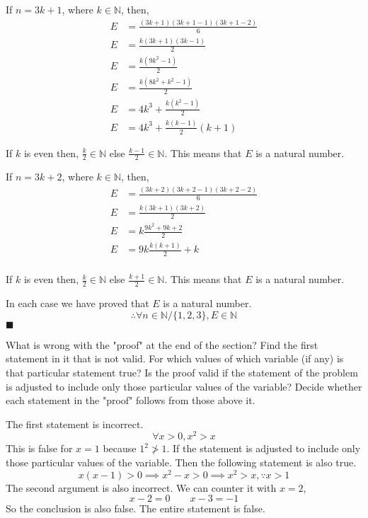 \documentclass{exam}
\theoremstyle{mytheoremstyle}
\theoremstyle{mytheoremstyle}
\theoremstyle{myproblemstyle}
\begin{document}
\begin{questions}
\begin{solution}
		If \(n=3k+1\), where \(k\in\mathbb{N}\), then,
		\begin{equation}
			\begin{split}
				E&=\frac{(3k+1)(3k+1-1)(3k+1-2)}{6}\\
				E&=\frac{k(3k+1)(3k-1)}{2}\\
				E&=\frac{k(9k^2-1)}{2}\\
				E&=\frac{k(8k^2+k^2-1)}{2}\\
				E&=4k^3+\frac{k(k^2-1)}{2}\\
				E&=4k^3+\frac{k(k-1)}{2}(k+1)
			\end{split}
		\end{equation}

		If \(k\) is even then, \(\displaystyle\frac{k}{2}\in\mathbb{N}\) else \(\displaystyle\frac{k-1}{2}\in\mathbb{N}\). This means that \(E\) is a natural number.

		If \(n=3k+2\), where \(k\in\mathbb{N}\), then,
		\begin{equation}
			\begin{split}
				E&=\frac{(3k+2)(3k+2-1)(3k+2-2)}{6}\\
				E&=\frac{k(3k+1)(3k+2)}{2}\\
				E&=k\frac{9k^2+9k+2}{2}\\
				E&=9k\frac{k(k+1)}{2}+k\\
			\end{split}
		\end{equation}

		If \(k\) is even then, \(\displaystyle\frac{k}{2}\in\mathbb{N}\) else \(\displaystyle\frac{k+1}{2}\in\mathbb{N}\). This means that \(E\) is a natural number.

		In each case we have proved that \(E\) is a natural number.
		\[\therefore \forall n\in\mathbb{N}/\{1,2,3\},E\in\mathbb{N}\]
		\center \(\blacksquare\)
	\end{solution}

	\question What is wrong with the "proof" at the end of the section? Find the first statement in it that is not valid. For which values of which variable (if any) is that particular statement true? Is the proof valid if the statement of the problem is adjusted to include only those particular values of the variable? Decide whether each statement in the "proof" follows from those above it.
	\begin{solution}
		The first statement is incorrect.
		\[\forall x>0, x^2>x\]
		This is false for \(x=1\) because \(1^2\ngtr 1\). If the statement is adjusted to include only those particular values of the variable. Then the following statement is also true.
		\[x(x-1)>0\implies x^2-x>0\implies x^2>x, \because x>1\]
		The second argument is also incorrect. We can counter it with \(x=2\),
		\[x-2=0 \qquad x-3=-1\]
		So the conclusion is also false. The entire statement is false.
	\end{solution}
\end{questions}
\end{document}
